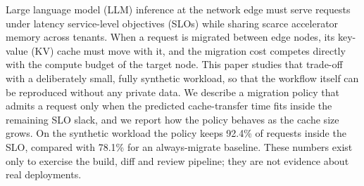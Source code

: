 Large language model (LLM) inference at the network edge must serve requests under latency service-level objectives (SLOs) while sharing scarce accelerator memory across tenants.
When a request is migrated between edge nodes, its key-value (KV) cache must move with it, and the migration cost competes directly with the compute budget of the target node.
This paper studies that trade-off with a deliberately small, fully synthetic workload, so that the workflow itself can be reproduced without any private data.
We describe a migration policy that admits a request only when the predicted cache-transfer time fits inside the remaining SLO slack, and we report how the policy behaves as the cache size grows.
On the synthetic workload the policy keeps 92.4\% of requests inside the SLO, compared with 78.1\% for an always-migrate baseline.
These numbers exist only to exercise the build, diff and review pipeline; they are not evidence about real deployments.
